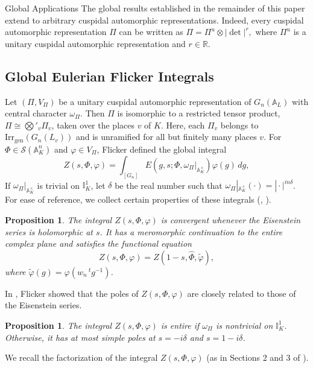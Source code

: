 \documentclass[12pt,reqno]{amsart}
\numberwithin{equation}{section}%
\numberwithin{equation}{subsection}
\newtheorem{prop}[equation]{Proposition}
\theoremstyle{definition}
\theoremstyle{remark}
\begin{document}
\begin{section}{Global Applications}
The global results established in the remainder of this paper extend to arbitrary cuspidal
automorphic representations. Indeed, every cuspidal automorphic
representation $\Pi$ can be written as
$\Pi=\Pi^u\otimes|\det|^r,$
where $\Pi^u$ is a unitary cuspidal automorphic representation and
$r\in\mathbb{R}$.


\subsection{Global Eulerian Flicker Integrals}

Let $(\Pi, V_\Pi)$ be a unitary cuspidal automorphic representation of $G_n(\mathbb{A}_L)$ with central character $\omega_\Pi$. Then $\Pi$ is isomorphic to a restricted tensor product, $\Pi \cong \bigotimes'_v \Pi_v$, taken over the places $v$ of $K$. Here, each $\Pi_v$ belongs to $\mathrm{Irr}_{\mathrm{gen}}(G_n(L_v))$ and is unramified for all but finitely many places $v$. For $\Phi \in \mathcal{S}(\mathbb{A}_K^n)$ and $\varphi \in V_\Pi$, Flicker \cite{Fli1988} defined the global integral
\[
Z(s, \Phi, \varphi) = \int_{[G_n]} E(g, s; \Phi, \omega_\Pi|_{\mathbb{A}_K^\times}) \varphi(g) \, dg,
\]
If $\omega_\Pi|_{\mathbb{A}_K^\times}$ is trivial on $\mathbb{I}_K^1$, let $\delta$ be the real number such that $\omega_\Pi|_{\mathbb{A}_K^\times}(\cdot) = |\cdot|^{in\delta}$. For ease of reference, we collect certain properties of these integrals (\cite{Fli1988}, \cite{Kab2004}).

\begin{prop}\label{global-integral-fe1}
The integral $Z(s, \Phi, \varphi)$ is convergent whenever the Eisenstein series is holomorphic at $s$. It has a meromorphic continuation to the entire complex plane and satisfies the functional equation
\[
Z(s, \Phi, \varphi) = Z(1 - s, \widehat{\Phi}, \widetilde{\varphi}),
\]
where $\widetilde{\varphi}(g) = \varphi(w_n\,{}^tg^{-1})$.
\end{prop}

In \cite{Fli1988}, Flicker showed that the poles of $Z(s, \Phi, \varphi)$ are closely related to those of the Eisenstein series.

\begin{prop}\label{poles-global}
The integral $Z(s, \Phi, \varphi)$ is entire if $\omega_\Pi$ is nontrivial on $\mathbb{I}_K^1$. Otherwise, it has at most simple poles at $s = -i\delta$ and $s = 1 - i\delta$.
\end{prop}

We recall the factorization of the integral $Z(s, \Phi, \varphi)$ (as in Sections 2 and 3 of \cite{Fli1988}).


\end{section}
\end{document}
